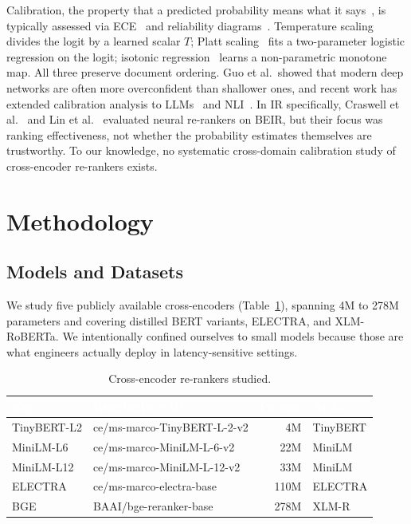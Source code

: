 \documentclass[conference]{IEEEtran}
\newcommand{\thead}[1]{\textcolor{white}{\textbf{#1}}}
\begin{document}
Calibration, the property that a predicted probability means what it
says~\cite{degroot1983}, is typically assessed via ECE~\cite{naeini2015} and
reliability diagrams~\cite{niculescu2005}. Temperature scaling~\cite{guo2017}
divides the logit by a learned scalar $T$; Platt scaling~\cite{platt1999}
fits a two-parameter logistic regression on the logit; isotonic
regression~\cite{zadrozny2002} learns a non-parametric monotone map. All
three preserve document ordering. Guo et al.\ showed that modern deep
networks are often more overconfident than shallower ones, and recent work
has extended calibration analysis to LLMs~\cite{kadavath2022,tian2023} and
NLI~\cite{desai2020}. In IR specifically, Craswell et al.~\cite{craswell2020}
and Lin et al.~\cite{lin2021pyserini} evaluated neural re-rankers on BEIR,
but their focus was ranking effectiveness, not whether the probability
estimates themselves are trustworthy. To our knowledge, no systematic
cross-domain calibration study of cross-encoder re-rankers exists.

\section{Methodology}
\label{sec:method}

\subsection{Models and Datasets}

We study five publicly available cross-encoders (Table~\ref{tab:models}),
spanning 4M to 278M parameters and covering distilled BERT variants,
ELECTRA, and XLM-RoBERTa. We intentionally confined ourselves to small
models because those are what engineers actually deploy in latency-sensitive
settings.

\begin{table}[t]
\centering
\caption{Cross-encoder re-rankers studied.}
\label{tab:models}
\scriptsize
\begin{tabular}{llrl}
\toprule
\rowcolor{headblue}
\thead{Key} & \thead{HuggingFace ID} & \thead{Params} & \thead{Arch.} \\
\midrule
\rowcolor{rowlight}
TinyBERT-L2  & ce/ms-marco-TinyBERT-L-2-v2 & 4M   & TinyBERT \\
\rowcolor{rowwhite}
MiniLM-L6    & ce/ms-marco-MiniLM-L-6-v2   & 22M  & MiniLM \\
\rowcolor{rowlight}
MiniLM-L12   & ce/ms-marco-MiniLM-L-12-v2  & 33M  & MiniLM \\
\rowcolor{rowwhite}
ELECTRA      & ce/ms-marco-electra-base     & 110M & ELECTRA \\
\rowcolor{rowlight}
BGE          & BAAI/bge-reranker-base       & 278M & XLM-R \\
\bottomrule
\end{tabular}
\vspace{-0.3cm}
\end{table}
\end{document}
